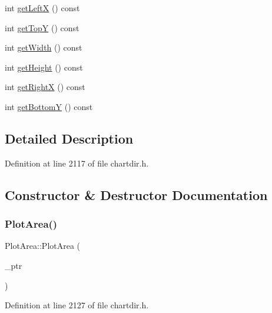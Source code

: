 \begin{DoxyCompactItemize}
\item 
int \hyperlink{class_plot_area_a315c48a42edd9b50b9d9cb83f1adaaf4}{get\+LeftX} () const
\item 
int \hyperlink{class_plot_area_aef78dfa0ea0f6ca79ae233de69d4478b}{get\+TopY} () const
\item 
int \hyperlink{class_plot_area_a9d7e77031904a16adc9eafa7576a613f}{get\+Width} () const
\item 
int \hyperlink{class_plot_area_a2325837475a874fe9b8eff161422f973}{get\+Height} () const
\item 
int \hyperlink{class_plot_area_a4295aadd8964a04a6d14509542f5201f}{get\+RightX} () const
\item 
int \hyperlink{class_plot_area_ac11438738fc19e074cc74c65bece8583}{get\+BottomY} () const
\end{DoxyCompactItemize}


\subsection{Detailed Description}


Definition at line 2117 of file chartdir.\+h.



\subsection{Constructor \& Destructor Documentation}
\mbox{\label{class_plot_area_a4b38b54794b596846e0659be8f729392}} 
\subsubsection{\texorpdfstring{Plot\+Area()}{PlotArea()}}
{\footnotesize\ttfamily Plot\+Area\+::\+Plot\+Area (\begin{DoxyParamCaption}\item[{Plot\+Area\+Internal $\ast$}]{\+\_\+ptr }\end{DoxyParamCaption})\hspace{0.3cm}{\ttfamily [inline]}}



Definition at line 2127 of file chartdir.\+h.

\mbox{\label{class_plot_area_ae91f833061c93637f8c90b1f2a380400}} 
